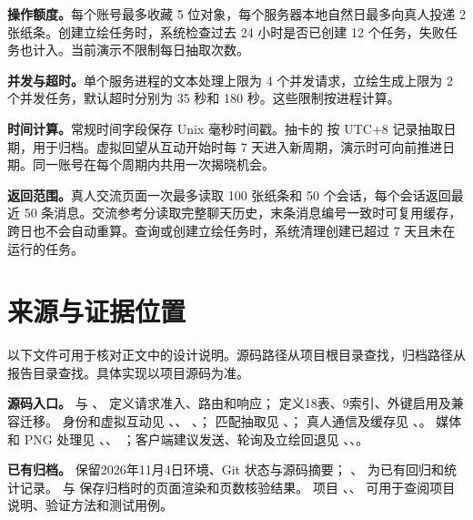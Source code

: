 \clearpage
\noindent\textbf{操作额度。}每个账号最多收藏 5 位对象，每个服务器本地自然日最多向真人投递 2 张纸条。创建立绘任务时，系统检查过去 24 小时是否已创建 12 个任务，失败任务也计入。当前演示不限制每日抽取次数。

\noindent\textbf{并发与超时。}单个服务进程的文本处理上限为 4 个并发请求，立绘生成上限为 2 个并发任务，默认超时分别为 35 秒和 180 秒。这些限制按进程计算。

\noindent\textbf{时间计算。}常规时间字段保存 Unix 毫秒时间戳。抽卡的  按 UTC+8 记录抽取日期，用于归档。虚拟回望从互动开始时每 7 天进入新周期，演示时可向前推进日期。同一账号在每个周期内共用一次揭晓机会。

\noindent\textbf{返回范围。}真人交流页面一次最多读取 100 张纸条和 50 个会话，每个会话返回最近 50 条消息。交流参考分读取完整聊天历史，末条消息编号一致时可复用缓存，跨日也不会自动重算。查询或创建立绘任务时，系统清理创建已超过 7 天且未在运行的任务。

\clearpage
\section{来源与证据位置}
以下文件可用于核对正文中的设计说明。源码路径从项目根目录查找，归档路径从报告目录查找。具体实现以项目源码为准。

\noindent\textbf{源码入口。}
 与 、
定义请求准入、路由和响应； 定义18表、9索引、外键启用及兼容迁移。
身份和虚拟互动见 、、
、；
匹配抽取见 、；
真人通信及缓存见 、。
媒体和 PNG 处理见 、、
；客户端建议发送、轮询及立绘回退见
、、。

\noindent\textbf{已有归档。}
 保留2026年11月4日环境、Git 状态与源码摘要；
、
为已有回归和统计记录。 与
 保存归档时的页面渲染和页数核验结果。
项目 、、
可用于查阅项目说明、验证方法和测试用例。
